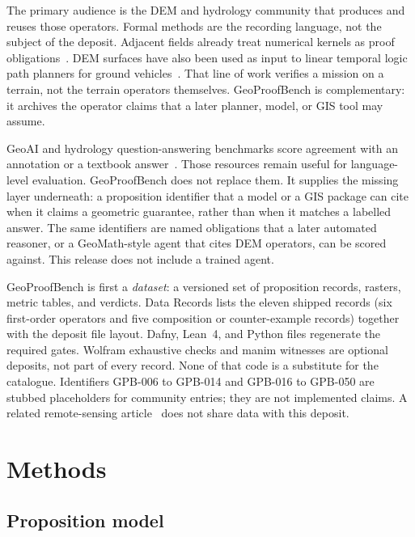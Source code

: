 \documentclass[11pt,a4paper]{article}
\begin{document}
The primary audience is the DEM and hydrology community that produces and
reuses those operators. Formal methods are the recording language, not the
subject of the deposit. Adjacent fields already treat numerical kernels as
proof obligations~\cite{boldo2009,melquiond2008,fumex2017,fulton2015,mitsch2017,zinzindohoue2017,leino2010,mathlib2020}.
DEM surfaces have also been used as input to linear temporal logic path
planners for ground vehicles~\cite{toscano2024}. That line of work
verifies a mission on a terrain, not the terrain operators themselves.
GeoProofBench is complementary: it archives the operator claims that a
later planner, model, or GIS tool may assume.

GeoAI and hydrology question-answering benchmarks
score agreement with an annotation or a textbook
answer~\cite{mai2024,kizilkaya2025}. Those resources remain useful for
language-level evaluation. GeoProofBench does not replace them. It supplies
the missing layer underneath: a proposition identifier that a model or a
GIS package can cite when it claims a geometric guarantee, rather than
when it matches a labelled answer. The same identifiers are named
obligations that a later automated reasoner, or a GeoMath-style agent
that cites DEM operators, can be scored against. This release does not
include a trained agent.

GeoProofBench is first a \emph{dataset}: a versioned set of proposition
records, rasters, metric tables, and verdicts. Data Records lists the
eleven shipped records (six first-order operators and five composition
or counter-example records) together with the deposit file layout.
Dafny, Lean~4, and Python files regenerate the required gates. Wolfram
exhaustive checks and manim witnesses are optional deposits, not part of
every record. None of that code is a substitute for the catalogue.
Identifiers GPB-006 to GPB-014 and
GPB-016 to GPB-050 are stubbed placeholders for community entries; they are not
implemented claims.
A related remote-sensing article~\cite{guo2025sam} does not share data
with this deposit.

\section{Methods}

\subsection{Proposition model}
\end{document}
